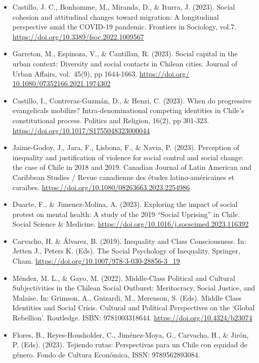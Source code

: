 \documentclass[
  12pt,
]{article}
\begin{document}
\begin{itemize}
\item
  Castillo, J. C., Bonhomme, M., Miranda, D., \& Iturra, J. (2023). Social cohesion and attitudinal changes toward migration: A longitudinal perspective amid the COVID-19 pandemic. Frontiers in Sociology, vol.7. \url{https://doi.org/10.3389/fsoc.2022.1009567}
\item
  Garreton, M., Espinoza, V., \& Cantillan, R. (2023). Social capital in the urban context: Diversity and social contacts in Chilean cities. Journal of Urban Affairs, vol.~45(9), pp 1644-1663. \href{https://doi.org/\%2010.1080/07352166.2021.1974302}{https://doi.org/ 10.1080/07352166.2021.1974302}
\item
  Castillo, I., Contreras-Guzmán, D., \& Henzi, C. (2023). When do progressive evangelicals mobilize? Intra-denominational competing identities in Chile's constitutional process. Politics and Religion, 16(2), pp 301-323. \url{https://doi.org/10.1017/S1755048323000044}
\item
  Jaime-Godoy, J., Jara, F., Lisbona, F., \& Navia, P. (2023). Perception of inequality and justification of violence for social control and social change: the case of Chile in 2018 and 2019. Canadian Journal of Latin American and Caribbean Studies / Revue canadienne des études latino-américaines et caraïbes. \url{https://doi.org/10.1080/08263663.2023.2254986}
\item
  Duarte, F., \& Jimenez-Molina, A. (2023). Exploring the impact of social protest on mental health: A study of the 2019 ``Social Uprising'' in Chile. Social Science \& Medicine. \url{https://doi.org/10.1016/j.socscimed.2023.116392}
\item
  Carvacho, H. \& Álvarez, B. (2019). Inequality and Class Consciousness. In: Jetten J., Peters K. (Eds). The Social Psychology of Inequality. Springer, Cham. \url{https://doi.org/10.1007/978-3-030-28856-3_19}
\item
  Méndez, M. L., \& Gayo, M. (2022). Middle-Class Political and Cultural Subjectivities in the Chilean Social Outburst: Meritocracy, Social Justice, and Malaise. In: Grimson, A., Guizardi, M., Merenson, S. (Eds). Middle Class Identities and Social Crisis. Cultural and Political Perspectives on the `Global Rebellion'. Routledge. ISBN: 9781003318644. \url{https://doi.org/10.4324/b23074}
\item
  Flores, B., Reyes-Housholder, C., Jiménez-Moya, G., Carvacho, H., \& Jirón, P. (Eds). (2023). Tejiendo rutas: Perspectivas para un Chile con equidad de género. Fondo de Cultura Económica, ISSN: 9789562893084.
\end{itemize}
\end{document}
